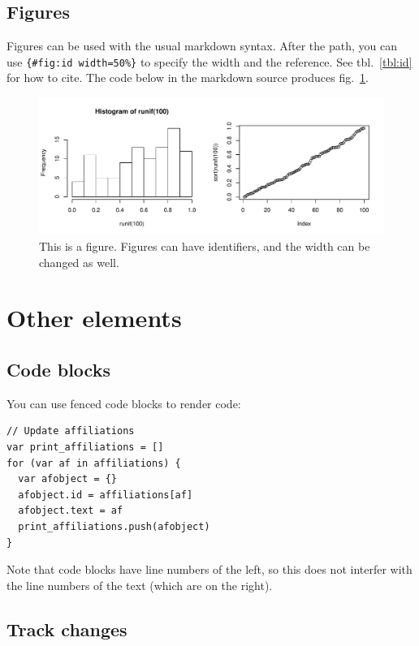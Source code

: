 \documentclass[12pt]{article}
\begin{document}
\subsection{Figures}\label{figures}

Figures can be used with the usual markdown syntax. After the path, you
can use \lstinline!{#fig:id width=50%}! to specify the width and the
reference. See tbl.~\ref{tbl:id} for how to cite. The code below in the
markdown source produces fig.~\ref{fig:id}.

\begin{figure}
\centering
\includegraphics[width=1.00000\textwidth]{figure/histogram-1.pdf}
\caption{This is a figure. Figures can have identifiers, and the width
can be changed as well.}\label{fig:id}
\end{figure}

\section{Other elements}\label{other-elements}

\subsection{Code blocks}\label{code-blocks}

You can use fenced code blocks to render code:

\begin{lstlisting}
// Update affiliations
var print_affiliations = []
for (var af in affiliations) {
  var afobject = {}
  afobject.id = affiliations[af]
  afobject.text = af
  print_affiliations.push(afobject)
}
\end{lstlisting}

Note that code blocks have line numbers of the left, so this does not
interfer with the line numbers of the text (which are on the right).

\subsection{Track changes}\label{track-changes}
\end{document}

